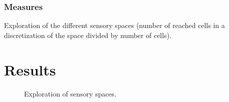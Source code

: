 \documentclass[10pt,letterpaper]{article}
\begin{document}
		
		\subsubsection{Measures}
			
			Exploration of the different sensory spaces (number of reached cells in a discretization of the space divided by number of cells).
				
		
	
%


\section{Results}


		\begin{figure}[ht]
			\centering
			\caption{Exploration of sensory spaces.}
			\label{res_explo}
		\end{figure}
	
\end{document}
